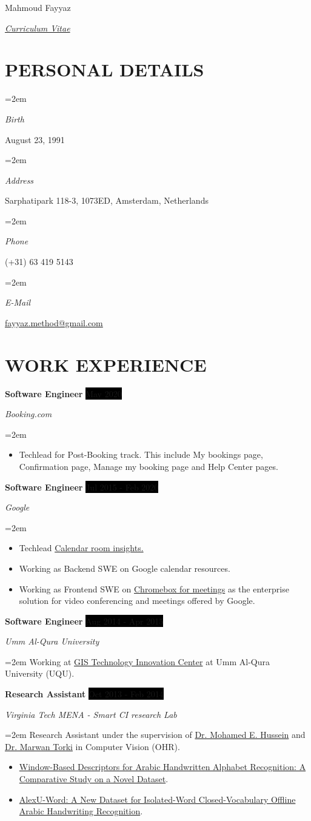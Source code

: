 \documentclass[paper=a4,fontsize=11pt]{scrartcl} %
\newlength{\spacebox}
\newcommand{\sepspace}{\vspace*{0.5em}}		%
\newcommand{\MyName}[1]{ %
		\Huge \usefont{OT1}{phv}{b}{n} \hfill #1
		\par \normalsize \normalfont}
\newcommand{\MySlogan}[1]{ %
		\large \usefont{OT1}{phv}{m}{n}\hfill \textit{#1}
		\par \normalsize \normalfont}
\newcommand{\NewPart}[1]{\section*{\uppercase{#1}}}
\newcommand{\PersonalEntry}[2]{
		\noindent\hangindent=2em\hangafter=0 %
		\parbox{\spacebox}{        %
		\textit{#1}}		       %
		\hspace{1.5em} #2 \par}    %
\newcommand{\EducationEntry}[4]{
		\noindent \textbf{#1} \hfill      %
		\colorbox{Black}{%
			\parbox{6em}{%
			\hfill\color{White}#2}} \par  %
		\noindent \textit{#3} \par        %
		\noindent\hangindent=2em\hangafter=0 \small #4 %
		\normalsize \par}
\newcommand{\WorkEntry}[4]{				  %
		\noindent \textbf{#1} \hfill      %
		\colorbox{Black}{\color{White}#2} \par  %
		\noindent \textit{#3} \par              %
		\noindent\hangindent=2em\hangafter=0 \small #4 %
		\normalsize \par}
\begin{document}

\MyName{Mahmoud Fayyaz}
\MySlogan{\href{http://phiiaz.github.io/Resume}{Curriculum Vitae}}

\sepspace

\NewPart{Personal details}{}

	\PersonalEntry{Birth}{August 23, 1991}
	\PersonalEntry{Address}{Sarphatipark 118-3, 1073ED, Amsterdam, Netherlands}
	\PersonalEntry{Phone}{(+31) 63 419 5143}
	\PersonalEntry{E-Mail}{\href{mailto:fayyaz.method@gmail.com}{fayyaz.method@gmail.com}}

\NewPart{Work experience}{}

\WorkEntry{Software Engineer}{May 2020}{Booking.com}{
	\begin{itemize}
		\item Techlead for Post-Booking track. This include My bookings page, Confirmation page, Manage my booking page and Help Center pages.  
	\end{itemize}}
\sepspace

\WorkEntry{Software Engineer}{Jul 2015 - Feb 2020}{Google}{
	\begin{itemize}
		\item Techlead \href{https://gsuiteupdates.googleblog.com/2018/08/manage-meeting-rooms-efficiently.html}{\color{blue}Calendar room insights.}
		\item Working as Backend SWE on Google calendar resources.
		\item Working as Frontend SWE on \href{https://www.google.se/work/chrome/devices/for-meetings/}{\color{blue}Chromebox for meetings} as the enterprise solution for video conferencing and meetings offered by Google.
	\end{itemize}}
\sepspace

	\WorkEntry{Software Engineer}{Aug 2014 - Apr 2015}{Umm Al-Qura University}{Working at \href{http://www.gistic.org/}{GIS Technology Innovation Center} at Umm Al-Qura University (UQU).}

	\WorkEntry{Research Assistant}{Oct 2013 - Feb 2014}{Virginia Tech MENA - Smart CI research Lab}{Research Assistant under the supervision of \href{http://scholar.google.com/citations?user=jCUt0o0AAAAJ&hl=en}{Dr. Mohamed E. Hussein} and \href{http://scholar.google.com/citations?user=aYLNZT4AAAAJ&hl=en}{Dr. Marwan Torki} in Computer Vision (OHR).
	\begin{itemize}
		\item \href{http://arxiv.org/abs/1411.3519}{Window-Based Descriptors for Arabic Handwritten Alphabet Recognition: A Comparative Study on a Novel Dataset}.
		\item \href{http://arxiv.org/abs/1411.4670}{AlexU-Word: A New Dataset for Isolated-Word Closed-Vocabulary Offline Arabic Handwriting Recognition}.
	\end{itemize}}
\end{document}
